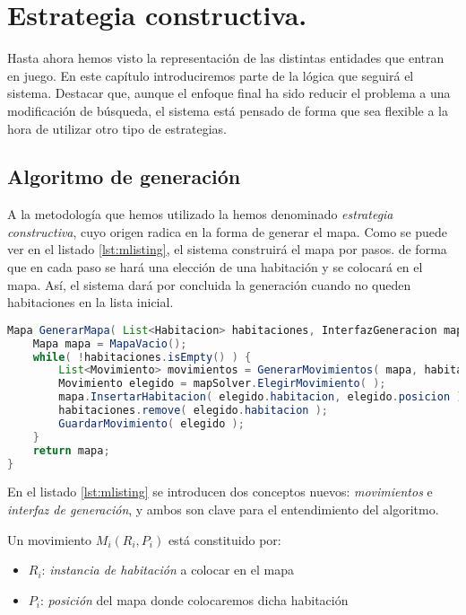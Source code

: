 \chapter{Estrategia constructiva.}\label{cap:capitulo4}

Hasta ahora hemos visto la representación de las distintas entidades que entran en juego. En este capítulo introduciremos parte de la lógica que seguirá el sistema. Destacar que, aunque el enfoque final ha sido reducir el problema a una modificación de búsqueda, el sistema está pensado de forma que sea flexible a la hora de utilizar otro tipo de estrategias.


\section{Algoritmo de generación}
A la metodología que hemos utilizado la hemos denominado \emph{estrategia constructiva}, cuyo origen radica en la forma de generar el mapa. Como se puede ver en el listado \ref{lst:mlisting}, el sistema construirá el mapa por pasos. de forma que en cada paso se hará una elección de una habitación y se colocará en el mapa. Así, el sistema dará por concluida la generación cuando no queden habitaciones en la lista inicial.

\begin{lstlisting}[caption={Algoritmo constructivo para generar mapas},label={lst:mlisting},language=Java]
Mapa GenerarMapa( List<Habitacion> habitaciones, InterfazGeneracion mapSolver ) {
	Mapa mapa = MapaVacio();
	while( !habitaciones.isEmpty() ) {
		List<Movimiento> movimientos = GenerarMovimientos( mapa, habitaciones );
		Movimiento elegido = mapSolver.ElegirMovimiento( );
		mapa.InsertarHabitacion( elegido.habitacion, elegido.posicion );
		habitaciones.remove( elegido.habitacion );
		GuardarMovimiento( elegido );
	}
	return mapa;
}
\end{lstlisting}

En el listado \ref{lst:mlisting} se introducen dos conceptos nuevos: \emph{movimientos} e \emph{interfaz de generación}, y ambos son clave para el entendimiento del algoritmo.

Un movimiento $M_i(R_i,P_i)$ está constituido por:

\begin{itemize}
	\item $R_i$: \emph{instancia de habitación} a colocar en el mapa
	\item $P_i$: \emph{posición} del mapa donde colocaremos dicha habitación
\end{itemize}


